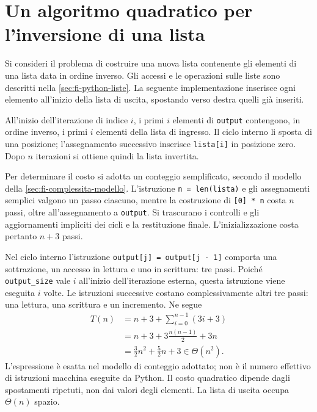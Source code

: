 \section{Un algoritmo quadratico per l'inversione di una lista}
\label{sec:fi-complessita-reverse-quadratico}

Si consideri il problema di costruire una nuova lista contenente gli
elementi di una lista data in ordine inverso. Gli accessi e le
operazioni sulle liste sono descritti nella \cref{sec:fi-python-liste}.
La seguente implementazione inserisce ogni elemento all'inizio della
lista di uscita, spostando verso destra quelli già inseriti.



All'inizio dell'iterazione di indice \(i\), i primi \(i\) elementi di
\texttt{output} contengono, in ordine inverso, i primi \(i\) elementi
della lista di ingresso. Il ciclo interno li sposta di una posizione;
l'assegnamento successivo inserisce \texttt{lista[i]} in posizione
zero. Dopo \(n\) iterazioni si ottiene quindi la lista invertita.

Per determinare il costo si adotta un conteggio semplificato, secondo
il modello della \cref{sec:fi-complessita-modello}. L'istruzione
\texttt{n = len(lista)} e gli assegnamenti semplici valgono un passo
ciascuno, mentre la costruzione di \texttt{[0] * n} costa \(n\) passi,
oltre all'assegnamento a \texttt{output}. Si trascurano i controlli
e gli aggiornamenti impliciti dei cicli e la restituzione finale.
L'inizializzazione costa pertanto \(n+3\) passi.

Nel ciclo interno l'istruzione
\texttt{output[j] = output[j - 1]} comporta una sottrazione,
un accesso in lettura e uno in scrittura: tre passi. Poiché
\texttt{output\_size} vale \(i\) all'inizio dell'iterazione esterna,
questa istruzione viene eseguita \(i\) volte. Le istruzioni successive
costano complessivamente altri tre passi: una lettura, una scrittura e
un incremento. Ne segue
\begin{align*}
  T(n)
    &=n+3+\sum_{i=0}^{n-1}(3i+3)\\
    &=n+3+3\frac{n(n-1)}2+3n\\
    &=\frac32n^2+\frac52n+3
     \in\Theta(n^2).
\end{align*}
L'espressione è esatta nel modello di conteggio adottato; non è il
numero effettivo di istruzioni macchina eseguite da Python. Il costo
quadratico dipende dagli spostamenti ripetuti, non dai valori degli
elementi. La lista di uscita occupa \(\Theta(n)\) spazio.

